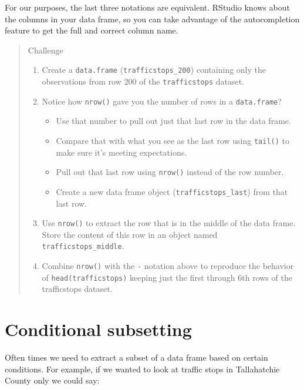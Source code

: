 \documentclass[]{book}
\providecommand{\tightlist}{%
  \setlength{\itemsep}{0pt}\setlength{\parskip}{0pt}}
\theoremstyle{definition}
\theoremstyle{definition}
\theoremstyle{definition}
\theoremstyle{remark}
\begin{document}
For our purposes, the last three notations are equivalent. RStudio knows
about the columns in your data frame, so you can take advantage of the
autocompletion feature to get the full and correct column name.

\begin{quote}
Challenge

\begin{enumerate}
\def\labelenumi{\arabic{enumi}.}
\item
  Create a \texttt{data.frame} (\texttt{trafficstops\_200}) containing
  only the observations from row 200 of the \texttt{trafficstops}
  dataset.
\item
  Notice how \texttt{nrow()} gave you the number of rows in a
  \texttt{data.frame}?

  \begin{itemize}
  \tightlist
  \item
    Use that number to pull out just that last row in the data frame.
  \item
    Compare that with what you see as the last row using \texttt{tail()}
    to make sure it's meeting expectations.
  \item
    Pull out that last row using \texttt{nrow()} instead of the row
    number.
  \item
    Create a new data frame object (\texttt{trafficstops\_last}) from
    that last row.
  \end{itemize}
\item
  Use \texttt{nrow()} to extract the row that is in the middle of the
  data frame. Store the content of this row in an object named
  \texttt{trafficstops\_middle}.
\item
  Combine \texttt{nrow()} with the \texttt{-} notation above to
  reproduce the behavior of \texttt{head(trafficstops)} keeping just the
  first through 6th rows of the trafficstops dataset.
\end{enumerate}
\end{quote}

\section{Conditional subsetting}\label{conditional-subsetting-1}

Often times we need to extract a subset of a data frame based on certain
conditions. For example, if we wanted to look at traffic stops in
Tallahatchie County only we could say:
\end{document}
